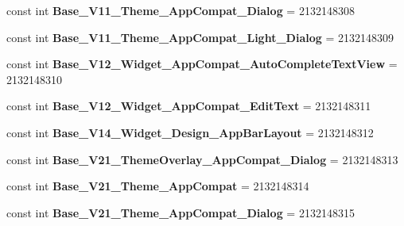 \begin{DoxyCompactItemize}
const int {\bfseries Base\+\_\+\+V11\+\_\+\+Theme\+\_\+\+App\+Compat\+\_\+\+Dialog} = 2132148308
\item 
\mbox{\label{classst_delivery_1_1_resource_1_1_style_ab45309f1bfeed7a6e35116d0e5743d81}} 
const int {\bfseries Base\+\_\+\+V11\+\_\+\+Theme\+\_\+\+App\+Compat\+\_\+\+Light\+\_\+\+Dialog} = 2132148309
\item 
\mbox{\label{classst_delivery_1_1_resource_1_1_style_a0a827c8d5849bd1191fc74d0677ba232}} 
const int {\bfseries Base\+\_\+\+V12\+\_\+\+Widget\+\_\+\+App\+Compat\+\_\+\+Auto\+Complete\+Text\+View} = 2132148310
\item 
\mbox{\label{classst_delivery_1_1_resource_1_1_style_a28a99659fb8eaa1ccf41f7d136c2f107}} 
const int {\bfseries Base\+\_\+\+V12\+\_\+\+Widget\+\_\+\+App\+Compat\+\_\+\+Edit\+Text} = 2132148311
\item 
\mbox{\label{classst_delivery_1_1_resource_1_1_style_aacfb46ae4d62c960bc92ff4c1f9a1aeb}} 
const int {\bfseries Base\+\_\+\+V14\+\_\+\+Widget\+\_\+\+Design\+\_\+\+App\+Bar\+Layout} = 2132148312
\item 
\mbox{\label{classst_delivery_1_1_resource_1_1_style_a32b4572b70e01a7bfffccc1d9a0ab7cd}} 
const int {\bfseries Base\+\_\+\+V21\+\_\+\+Theme\+Overlay\+\_\+\+App\+Compat\+\_\+\+Dialog} = 2132148313
\item 
\mbox{\label{classst_delivery_1_1_resource_1_1_style_a5e1cddd3916ee7f1ad9fb6d4fc5361f7}} 
const int {\bfseries Base\+\_\+\+V21\+\_\+\+Theme\+\_\+\+App\+Compat} = 2132148314
\item 
\mbox{\label{classst_delivery_1_1_resource_1_1_style_acfe7c562da5c48386de687f0a602868a}} 
const int {\bfseries Base\+\_\+\+V21\+\_\+\+Theme\+\_\+\+App\+Compat\+\_\+\+Dialog} = 2132148315
\item 
\mbox{\label{classst_delivery_1_1_resource_1_1_style_afd590411ea41421f2bcd454b19d4bd0c}} 

\end{DoxyCompactItemize}
